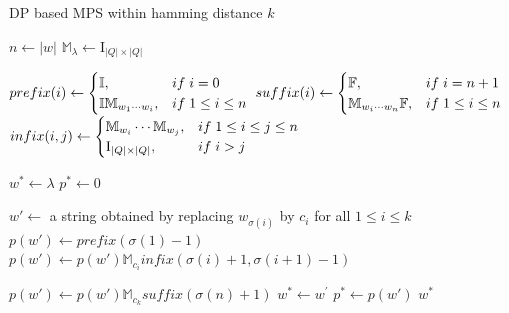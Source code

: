 \documentclass{article}
\theoremstyle{plain}
\theoremstyle{definition}
\theoremstyle{remark}
\begin{document}
\begin{algorithm}
\caption{DP based MPS within hamming distance $k$}\label{euclid}
\begin{algorithmic}[1]
    \State $n\leftarrow |w|$
    \State $\mathbb{M}_{\lambda} \leftarrow \mathrm{I}_{|Q|\times|Q|}$
    
    \State 
    $prefix(i) \leftarrow 
            \begin{cases}
                \mathbb{I}, & if \hspace{0.1cm} i=0\\
                \mathbb{I}\mathbb{M}_{w_{1}\cdots w_{i}}, & if \hspace{0.1cm} 1\leq i\leq n \\
            \end{cases}$\;
    \State 
    $suffix(i) \leftarrow 
            \begin{cases}
                \mathbb{F}, & if \hspace{0.1cm} i=n+1\\
                \mathbb{M}_{w_{i}\cdots w_{n}}\mathbb{F}, & if \hspace{0.1cm} 1\leq i\leq n \\
            \end{cases}$\;
    \State 
    $infix(i,j) \leftarrow 
            \begin{cases}
                \mathbb{M}_{w_{i}}\cdots\mathbb{M}_{w_{j}}, & if \hspace{0.1cm} 1\leq i\leq j\leq n\\
                \mathrm{I}_{|Q|\times|Q|}, & if \hspace{0.1cm} i>j \\
            \end{cases}$\;
            
    \State $w^{*} \leftarrow \lambda$
    \State $p^{*} \leftarrow 0$

            \State $w'\leftarrow$ a string obtained by replacing $w_{\sigma(i)}$ by $c_{i}$ for all $1\leq i \leq k$
            \State $p(w')\leftarrow prefix(\sigma(1)-1)$
                \State $p(w')\leftarrow p(w')\mathbb{M}_{c_{i}}infix(\sigma(i)+1,\sigma(i+1)-1)$
            \EndFor
            
            \State $p(w')\leftarrow p(w')\mathbb{M}_{c_{k}}suffix(\sigma(n)+1)$
                \State $w^{*} \leftarrow w^{\prime}$
                \State $p^{*} \leftarrow p(w')$
            \EndIf
        \EndFor
    \EndFor
    \State \Return $w^{*}$
\end{algorithmic}
\end{algorithm}
\end{document}
